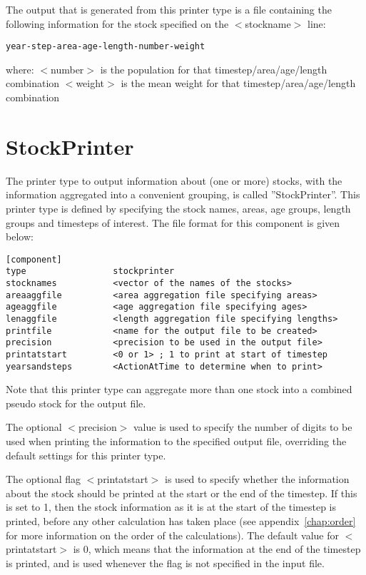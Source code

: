 \documentclass[10pt,twoside]{book}
\begin{document}
\bigskip
The output that is generated from this printer type is a file containing the following information for the stock specified on the $<$stockname$>$ line:

{\small\begin{verbatim}
year-step-area-age-length-number-weight
\end{verbatim}}

where:\newline
$<$number$>$ is the population for that timestep/area/age/length combination\newline
$<$weight$>$ is the mean weight for that timestep/area/age/length combination

\section{StockPrinter}\label{sec:stockprinter}
The printer type to output information about (one or more) stocks, with the information aggregated into a convenient grouping, is called ''StockPrinter''.  This printer type is defined by specifying the stock names, areas, age groups, length groups and timesteps of interest.  The file format for this component is given below:

{\small\begin{verbatim}
[component]
type                 stockprinter
stocknames           <vector of the names of the stocks>
areaaggfile          <area aggregation file specifying areas>
ageaggfile           <age aggregation file specifying ages>
lenaggfile           <length aggregation file specifying lengths>
printfile            <name for the output file to be created>
precision            <precision to be used in the output file>
printatstart         <0 or 1> ; 1 to print at start of timestep
yearsandsteps        <ActionAtTime to determine when to print>
\end{verbatim}}

Note that this printer type can aggregate more than one stock into a combined pseudo stock for the output file.

\bigskip
The optional $<$precision$>$ value is used to specify the number of digits to be used when printing the information to the specified output file, overriding the default settings for this printer type.

\bigskip
The optional flag $<$printatstart$>$ is used to specify whether the information about the stock should be printed at the start or the end of the timestep.  If this is set to 1, then the stock information as it is at the start of the timestep is printed, before any other calculation has taken place (see appendix~\ref{chap:order} for more information on the order of the calculations).  The default value for $<$printatstart$>$ is 0, which means that the information at the end of the timestep is printed, and is used whenever the flag is not specified in the input file.
\end{document}
